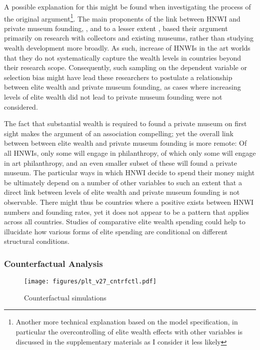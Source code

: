 \documentclass[11pt]{article}
\begin{document}
A possible explanation for this might be found when investigating the process of the original argument\footnote{Another more technical explanation based on the model specification, in particular the overcontrolling of elite wealth effects with other variables is discussed in the supplementary materials as I consider it less likely}.
The main proponents of the link between HNWI and private museum founding, \textcite{Gnyp_2015_collectors}, \textcite{Zorloni_Resch_2016_opportunities} and to a lesser extent \textcite{Walker_2019_collector}, based their argument primarily on research with collectors and existing museums, rather than studying wealth development more broadly.
As such, increase of HNWIs in the art worlds that they do not systematically capture the wealth levels in countries beyond their research scope.  
Consequently, such sampling on the dependent variable or selection bias might have lead these researchers to postulate a relationship between elite wealth and private museum founding, as cases where increasing levels of elite wealth did not lead to private museum founding were not considered. 


The fact that substantial wealth is required to found a private museum on first sight makes the argument of an association compelling; yet the overall link between between elite wealth and private museum founding is more remote: 
Of all HNWIs, only some will engage in philanthropy, of which only some will engage in art philanthropy, and  an even smaller subset of these will found a private museum.
The particular ways in which HNWI decide to spend their money might be ultimately depend on a number of other variables to such an extent that a direct link between levels of elite wealth and private museum founding is not observable.
There might thus be countries where a positive exists between HNWI numbers and founding rates, yet it does not appear to be a pattern that applies across all countries. 
Studies of comparative elite wealth spending could help to illucidate how various forms of elite spending are conditional on different structural conditions.








\subsubsection*{Counterfactual Analysis}

\begin{figure}[htbp]
\centering
\texttt{[image: figures/plt\_v27\_cntrfctl.pdf]}
\caption{\label{fig:cntrfctl}Counterfactual simulations}
\end{figure}
\end{document}
